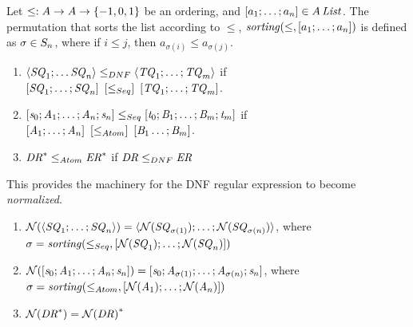 \documentclass[numbers]{sigplanconf}
\begin{document}
\begin{definition}
  Let $\leq : A \rightarrow A \rightarrow \{-1,0,1\}$ be an ordering,
  and $[ a_1;\ldots;a_n ]\in A\,\mathit{List}$.
  The permutation that sorts the list according to $\leq$,
  $\mathit{sorting}(\leq,[ a_1;\ldots;a_n ])$ is defined as
  $\sigma \in S_{n}$,
  where if $i\leq j$, then $a_{\sigma(i)} \leq a_{\sigma(j)}$.
\end{definition}

\begin{definition}\leavevmode
  \begin{enumerate}
  \item
    $\langle\mathit{SQ}_1;\ldots\mathit{SQ}_n\rangle
    \leq_{DNF}
    \langle\mathit{TQ}_1;\ldots;\mathit{TQ}_m\rangle$
    if\\
    $[ \mathit{SQ}_1;\ldots;\mathit{SQ}_n ]\hspace*{.5em}
    [ \leq_{Seq} ]\hspace*{.5em}
    [ \mathit{TQ}_1;\ldots;\mathit{TQ}_m ]$.
    
  \item
    $[\mathit{s}_0;\mathit{A}_1;\ldots;\mathit{A}_n;\mathit{s}_n]
    \leq_{Seq}
    [\mathit{t}_0;\mathit{B}_1;\ldots;\mathit{B}_m;\mathit{t}_m]$
    if\\
    $[ \mathit{A}_1;\ldots;\mathit{A}_n ]\hspace*{.5em}
    [ \leq_{Atom} ]\hspace*{.5em}
    [ \mathit{B}_1\ldots;\mathit{B}_m ]$.

  \item
    ${\mathit{DR}}^* \leq_{Atom} {\mathit{ER}}^*$ if
    $\mathit{DR} \leq_{DNF} \mathit{ER}$
  \end{enumerate}
\end{definition}

This provides the machinery for the DNF regular expression to become
\textit{normalized}.

\begin{definition}
  \leavevmode
  \begin{enumerate}
  \item $\mathcal{N}(\langle\mathit{SQ}_1;\ldots;\mathit{SQ}_n\rangle) =
    \langle\mathcal{N}(\mathit{SQ}_{\sigma(1)});\ldots;\mathcal{N}(\mathit{SQ}_{\sigma(n)})\rangle$,
    where
    $\sigma=\mathit{sorting}(\leq_{Seq},[ \mathcal{N}(\mathit{SQ}_1);\ldots;\mathcal{N}(\mathit{SQ}_n) ])$
  \item $\mathcal{N}([\mathit{s}_0;\mathit{A}_1;\ldots;\mathit{A}_n;\mathit{s}_n]) =
    [\mathit{s}_0;\mathit{A}_{\sigma(1)};\ldots;\mathit{A}_{\sigma(n)};\mathit{s}_n]$,
    where
    $\sigma=\mathit{sorting}(\leq_{Atom},[ \mathcal{N}(\mathit{A}_1);\ldots;\mathcal{N}(\mathit{A}_n) ])$
  \item $\mathcal{N}({\mathit{DR}}^*)={\mathcal{N}(\mathit{DR})}^*$
  \end{enumerate}
\end{definition}
\end{document}
